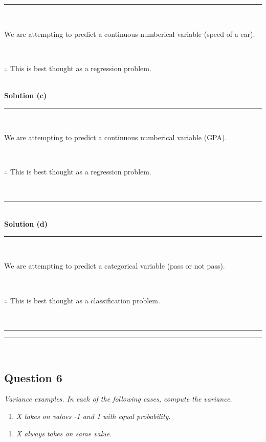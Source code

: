 \documentclass{article}
\begin{document}
\noindent\rule{\textwidth}{0.4pt}\\

\parbox{\textwidth}{We are attempting to predict a continuous numberical variable (speed of a car).}\\

\parbox{\textwidth}{$\therefore$ This is best thought as a regression problem.}\\

\textbf{Solution (c)}

\noindent\rule{\textwidth}{0.4pt}\\

\parbox{\textwidth}{We are attempting to predict a continuous numberical variable (GPA).}\\

\parbox{\textwidth}{$\therefore$ This is best thought as a regression problem.}\\

\noindent\rule{\textwidth}{0.4pt}\\

\textbf{Solution (d)}

\noindent\rule{\textwidth}{0.4pt}\\

\parbox{\textwidth}{We are attempting to predict a categorical variable (pass or not pass).}\\

\parbox{\textwidth}{$\therefore$ This is best thought as a classification problem.}\\

\noindent\rule{\textwidth}{0.4pt}

\noindent\rule{\textwidth}{0.4pt}\\

\newpage

\subsection*{Question 6}
\textit{Variance examples. In each of the following cases, compute the variance.}

\begin{enumerate}[label=(a)]
  \item \textit{X takes on values -1 and 1 with equal probability.}
\end{enumerate}

\begin{enumerate}[label=(b)]
  \item \textit{X always takes on same value.}
\end{enumerate}
\end{document}
